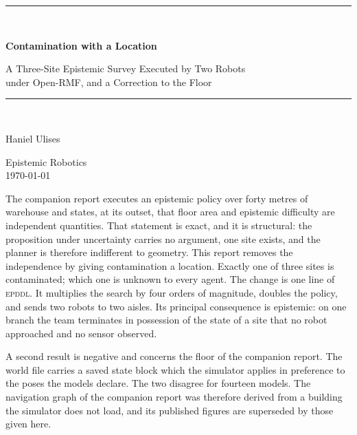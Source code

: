 \documentclass[11pt,a4paper]{article}
\theoremstyle{definition}
\begin{document}
\begin{titlepage}
\centering
\vspace*{2.4cm}
{\color{rulegrey}\rule{\textwidth}{0.8pt}}\\[0.9cm]
{\LARGE\bfseries Contamination with a Location\par}
\vspace{0.5cm}
{\large\color{slate} A Three-Site Epistemic Survey Executed by Two Robots\\ under Open-RMF, and a Correction to the Floor\par}
\vspace{0.7cm}
{\color{rulegrey}\rule{\textwidth}{0.8pt}}\\[1.4cm]

{\large Haniel Ulises\par}
\vspace{0.3cm}
{\color{slate} Epistemic Robotics}\\
\vspace{0.15cm}
{\color{slate}\today}

\vfill
{\color{slate}\small
The companion report executes an epistemic policy over forty metres of
warehouse and states, at its outset, that floor area and epistemic difficulty
are independent quantities. That statement is exact, and it is structural: the
proposition under uncertainty carries no argument, one site exists, and the
planner is therefore indifferent to geometry. This report removes the
independence by giving contamination a location. Exactly one of three sites is
contaminated; which one is unknown to every agent. The change is one line of
\textsc{epddl}. It multiplies the search by four orders of magnitude, doubles
the policy, and sends two robots to two aisles. Its principal consequence is
epistemic: on one branch the team terminates in possession of the state of a
site that no robot approached and no sensor observed.

\vspace{0.6em}
A second result is negative and concerns the floor of the companion report. The
world file carries a saved state block which the simulator applies in
preference to the poses the models declare. The two disagree for fourteen
models. The navigation graph of the companion report was therefore derived from
a building the simulator does not load, and its published figures are
superseded by those given here.}
\vspace{1.2cm}
\end{titlepage}

\tableofcontents
\newpage
\end{document}

